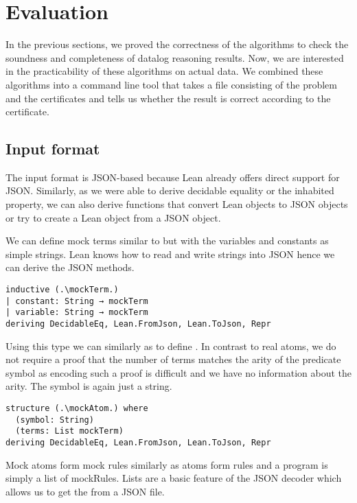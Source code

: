 \chapter{Evaluation}\label{sec:eval}

In the previous sections, we proved the correctness of the algorithms to check the soundness and completeness of datalog reasoning results. Now, we are interested in the practicability of these algorithms on actual data. We combined these algorithms into a command line tool that takes a file consisting of the problem and the certificates and tells us whether the result is correct according to the certificate. 

\section{Input format}

The input format is JSON-based because Lean already offers direct support for JSON. Similarly, as we were able to derive decidable equality or the inhabited property, we can also derive functions that convert Lean objects to JSON objects or try to create a Lean object from a JSON object.

We can define mock terms similar to \term but with the variables and constants as simple strings. Lean knows how to read and write strings into JSON hence we can derive the JSON methods.

\begin{lstlisting}
inductive (.\mockTerm.)
| constant: String → mockTerm
| variable: String → mockTerm
deriving DecidableEq, Lean.FromJson, Lean.ToJson, Repr
\end{lstlisting}

Using this type we can similarly as to \atom define \mockAtom. In contrast to real atoms, we do not require a proof that the number of terms matches the arity of the predicate symbol as encoding such a proof is difficult and we have no information about the arity. The symbol is again just a string.

\begin{lstlisting}
structure (.\mockAtom.) where
  (symbol: String)
  (terms: List mockTerm)
deriving DecidableEq, Lean.FromJson, Lean.ToJson, Repr
\end{lstlisting}

Mock atoms form mock rules similarly as atoms form rules and a program is simply a list of mockRules. Lists are a basic feature of the JSON decoder which allows us to get the from a JSON file. 

